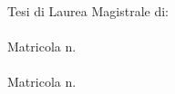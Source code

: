 \begin{titlepage}
\begin{center}
        \vfill  
        
        \flushright
        \normalsize{Tesi di Laurea Magistrale di:}\\
        \medskip \spacedlowsmallcaps{\myFirstAuthorName}\\
		Matricola n. \myMatrFirstAuthor \\ 
		\medskip\spacedlowsmallcaps{\mySecondAuthorName} \\
		Matricola n. \myMatrSecondAuthor \\
		
		\vfill 


    \end{center}  
\end{titlepage}